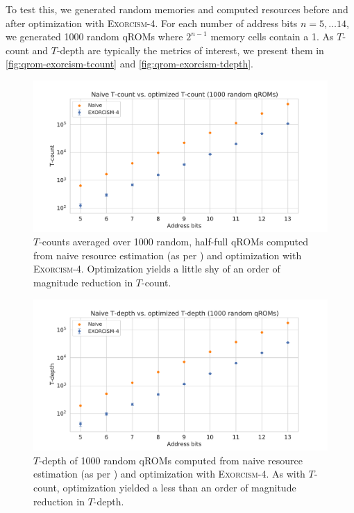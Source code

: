 \documentclass[a4paper,12pt]{article}
\begin{document}
To test this, we generated random memories and computed resources before and after optimization with \textsc{Exorcism-4}. 
For each number of address bits $n = 5, \ldots 14$, we generated 1000 random qROMs where $2^{n-1}$ memory cells contain a 1.
As $T$-count and $T$-depth are typically the metrics of interest, we present them in \autoref{fig:qrom-exorcism-tcount} and \autoref{fig:qrom-exorcism-tdepth}. 

\begin{figure}[ht]
 \centering
 \captionsetup{width=0.89\linewidth}
 \includegraphics[scale=0.55]{images/exorcism-t-count}
 \caption{$T$-counts averaged over 1000 random, half-full qROMs computed from naive resource estimation (as per \cite{DiMatteo2020}) and optimization with \textsc{Exorcism-4}. Optimization yields a little shy of an order of magnitude reduction in $T$-count.}
 \label{fig:qrom-exorcism-tcount}
\end{figure}

\begin{figure}[ht]
 \centering
 \captionsetup{width=0.89\linewidth}
 \includegraphics[scale=0.55]{images/exorcism-t-depth}
 \caption{$T$-depth of 1000 random qROMs computed from naive resource estimation (as per \cite{DiMatteo2020}) and optimization with \textsc{Exorcism-4}. As with $T$-count, optimization yielded a less than an order of magnitude reduction in $T$-depth.}
 \label{fig:qrom-exorcism-tdepth}
\end{figure}
\end{document}
